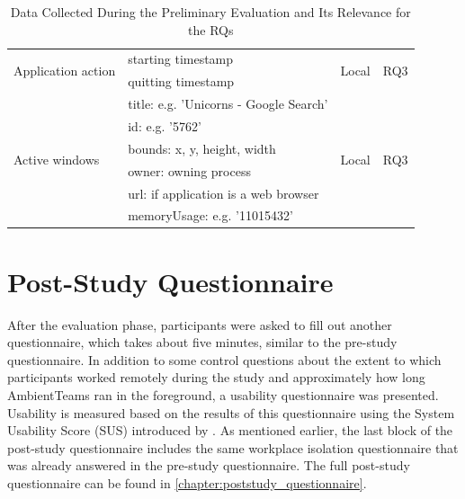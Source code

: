\begin{table}[h]
\begin{tabularx}{.9\textwidth}{l X l l}
        \midrule
        \multirow{2}{*}{Application action}  & starting timestamp                     & \multirow{2}{*}{Local}  & \multirow{2}{*}{RQ3    }      \\
                                             & quitting timestamp                     &                         &                               \\


        \midrule
        \multirow{6}{*}{Active windows}      & title: e.g. 'Unicorns - Google Search' & \multirow{6}{*}{Local}  & \multirow{6}{*}{RQ3}     \\
                                             & id: e.g. '5762'                        &                         &                               \\
                                             & bounds: x, y, height, width            &                         &                               \\
                                             & owner: owning process                  &                         &                               \\
                                             & url: if application is a web browser   &                         &                               \\
                                             & memoryUsage: e.g. '11015432'           &                         &                               \\
        \bottomrule
    \end{tabularx}
    \caption{Data Collected During the Preliminary Evaluation and Its Relevance for the RQs}
    \label{table:data}
\end{table}

\section{Post-Study Questionnaire}
\label{section:poststudy_questionnaire}
After the evaluation phase, participants were asked to fill out another questionnaire, which takes about five minutes, similar to the pre-study questionnaire. In addition to some control questions about the extent to which participants worked remotely during the study and approximately how long AmbientTeams ran in the foreground, a usability questionnaire was presented. Usability is measured based on the results of this questionnaire using the System Usability Score (SUS) introduced by \textcite{brooke1996sus}. As mentioned earlier, the last block of the post-study questionnaire includes the same workplace isolation questionnaire that was already answered in the pre-study questionnaire. The full post-study questionnaire can be found in \autoref{chapter:poststudy_questionnaire}.

